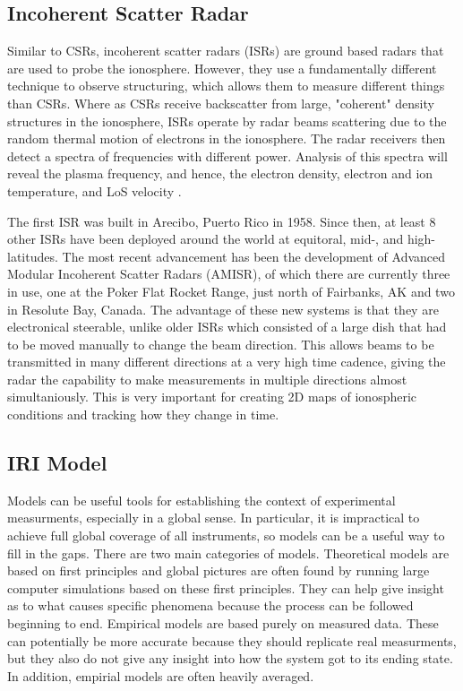 \subsection{Incoherent Scatter Radar}
\label{sec:isr}
Similar to CSRs, incoherent scatter radars (ISRs) are ground based radars that are used to probe the ionosphere.  However, they use a fundamentally different technique to observe structuring, which allows them to measure different things than CSRs.  Where as CSRs receive backscatter from large, "coherent" density structures in the ionosphere, ISRs operate by radar beams scattering due to the random thermal motion of electrons in the ionosphere.  The radar receivers then detect a spectra of frequencies with different power.  Analysis of this spectra will reveal the plasma frequency, and hence, the electron density, electron and ion temperature, and LoS velocity \citep{Gordon1958}.

The first ISR was built in Arecibo, Puerto Rico in 1958.  Since then, at least 8 other ISRs have been deployed around the world at equitoral, mid-, and high-latitudes.  The most recent advancement has been the development of Advanced Modular Incoherent Scatter Radars (AMISR), of which there are currently three in use, one at the Poker Flat Rocket Range, just north of Fairbanks, AK and two in Resolute Bay, Canada.  The advantage of these new systems is that they are electronical steerable, unlike older ISRs which consisted of a large dish that had to be moved manually to change the beam direction.  This allows beams to be transmitted in many different directions at a very high time cadence, giving the radar the capability to make measurements in multiple directions almost simultaniously.  This is very important for creating 2D maps of ionospheric conditions and tracking how they change in time.

\subsection{IRI Model}
\label{sec:iri}
Models can be useful tools for establishing the context of experimental measurments, especially in a global sense.  In particular, it is impractical to achieve full global coverage of all instruments, so models can be a useful way to fill in the gaps.  There are two main categories of models.  Theoretical models are based on first principles and global pictures are often found by running large computer simulations based on these first principles.  They can help give insight as to what causes specific phenomena because the process can be followed beginning to end.  Empirical models are based purely on measured data.  These can potentially be more accurate because they should replicate real measurments, but they also do not give any insight into how the system got to its ending state.  In addition, empirial models are often heavily averaged.

